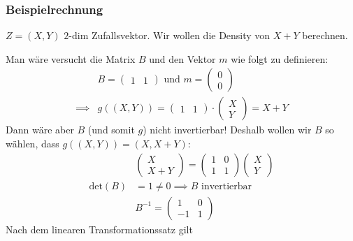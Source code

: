 \subsubsection*{Beispielrechnung}

$Z = (X, Y)$ $2$-dim Zufallsvektor. Wir wollen die Density von $X + Y$ berechnen.

Man wäre versucht die Matrix $B$ und den Vektor $m$ wie folgt zu definieren:
\begin{align*}
    &B= 
    \left(\begin{matrix}
        1 & 1
    \end{matrix}\right) 
    \text{ und } 
    m = \left(\begin{matrix}
        0\\
        0
    \end{matrix}\right)\\
    \implies &g((X,Y)) = 
    \left(\begin{matrix}
        1 & 1
    \end{matrix}\right) \cdot 
    \left(\begin{matrix}
        X\\
        Y
    \end{matrix}\right) = X + Y
\end{align*}
Dann wäre aber $B$ (und somit $g$) nicht invertierbar!
Deshalb wollen wir $B$ so wählen, dass $g((X,Y)) = (X, X + Y)$:
\begin{align*}
    &\left(\begin{matrix}
        X\\
        X + Y
    \end{matrix}\right) 
    = \left(\begin{matrix}
        1 & 0\\
        1 & 1
    \end{matrix}\right)
    \left(\begin{matrix}
        X\\
        Y
    \end{matrix}\right)\\
    \text{det}(B)&= 1 \neq 0 \implies B \text{ invertierbar}\\
    &B^{-1} = \left(\begin{matrix}
        1 & 0\\
        -1 & 1
    \end{matrix}\right)
\end{align*}
Nach dem linearen Transformationssatz gilt
